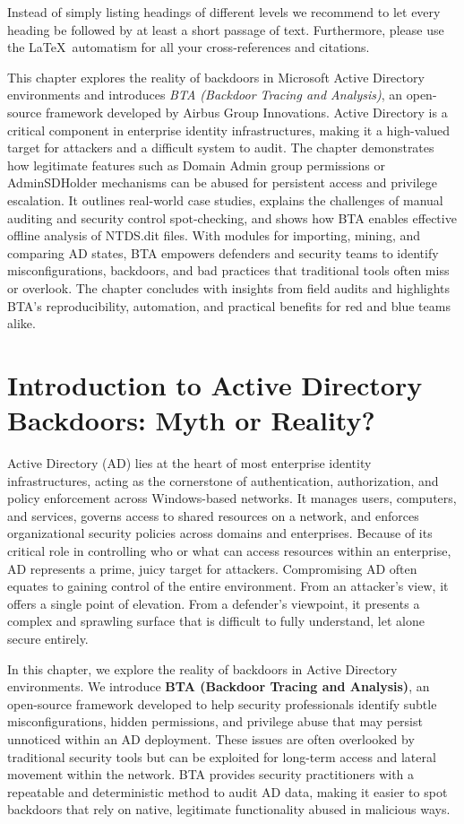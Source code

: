 Instead of simply listing headings of different levels we recommend to let every heading be followed by at least a short passage of text. Furthermore, please use the \LaTeX\ automatism for all your cross-references and citations.

This chapter explores the reality of backdoors in Microsoft Active Directory environments and introduces \textit{BTA (Backdoor Tracing and Analysis)}, an open-source framework developed by Airbus Group Innovations. Active Directory is a critical component in enterprise identity infrastructures, making it a high-valued target for attackers and a difficult system to audit. The chapter demonstrates how legitimate features such as Domain Admin group permissions or AdminSDHolder mechanisms can be abused for persistent access and privilege escalation. It outlines real-world case studies, explains the challenges of manual auditing and security control spot-checking, and shows how BTA enables effective offline analysis of NTDS.dit files. With modules for importing, mining, and comparing AD states, BTA empowers defenders and security teams to identify misconfigurations, backdoors, and bad practices that traditional tools often miss or overlook. The chapter concludes with insights from field audits and highlights BTA's reproducibility, automation, and practical benefits for red and blue teams alike.

\section{Introduction to Active Directory Backdoors: Myth or Reality?}

Active Directory (AD) lies at the heart of most enterprise identity infrastructures, acting as the cornerstone of authentication, authorization, and policy enforcement across Windows-based networks. It manages users, computers, and services, governs access to shared resources on a network, and enforces organizational security policies across domains and enterprises. Because of its critical role in controlling who or what can access resources within an enterprise, AD represents a prime, juicy target for attackers. Compromising AD often equates to gaining control of the entire environment. From an attacker's view, it offers a single point of elevation. From a defender's viewpoint, it presents a complex and sprawling surface that is difficult to fully understand, let alone secure entirely.

In this chapter, we explore the reality of backdoors in Active Directory environments. We introduce \textbf{BTA (Backdoor Tracing and Analysis)}, an open-source framework developed to help security professionals identify subtle misconfigurations, hidden permissions, and privilege abuse that may persist unnoticed within an AD deployment. These issues are often overlooked by traditional security tools but can be exploited for long-term access and lateral movement within the network. BTA provides security practitioners with a repeatable and deterministic method to audit AD data, making it easier to spot backdoors that rely on native, legitimate functionality abused in malicious ways.

